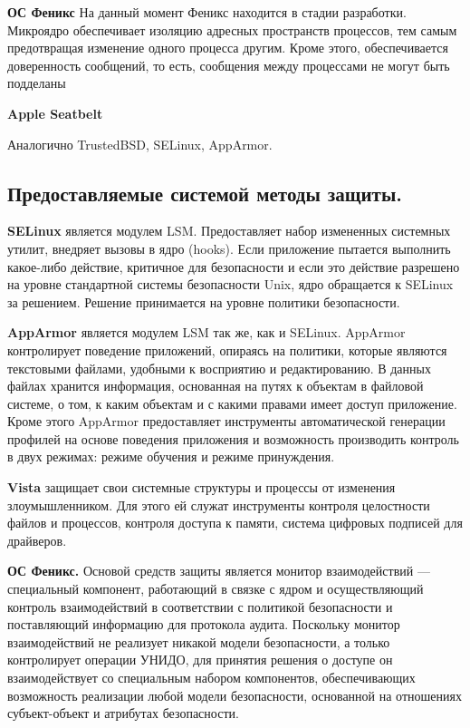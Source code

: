 \bigskip
{\bfseries ОС Феникс }
На данный момент Феникс находится в стадии разработки. 
Микроядро обеспечивает изоляцию адресных пространств 
процессов, тем самым предотвращая изменение одного 
процесса другим. Кроме этого, обеспечивается доверенность 
сообщений, то есть, сообщения между процессами не могут 
быть подделаны 

\bigskip
{\bfseries Apple Seatbelt}

Аналогично TrustedBSD, SELinux, AppArmor.

\bigskip
\subsection{Предоставляемые системой методы защиты.}

\bigskip
{\bfseries SELinux} является модулем LSM. 
Предоставляет набор измененных системных утилит, 
внедряет вызовы в ядро (hooks). Если приложение 
пытается выполнить какое-либо действие, критичное 
для безопасности и если это действие разрешено на 
уровне стандартной системы безопасности Unix, 
ядро обращается к SELinux за решением. Решение 
принимается на уровне политики безопасности. 

\bigskip
{\bfseries AppArmor} является модулем LSM так же, 
как и SELinux. AppArmor контролирует поведение 
приложений, опираясь на политики, которые являются 
текстовыми файлами, удобными к восприятию и редактированию. 
В данных файлах хранится информация, основанная на 
путях к объектам в файловой системе, о том, к каким 
объектам и с какими правами имеет доступ приложение. 
Кроме этого AppArmor предоставляет инструменты 
автоматической генерации профилей на основе поведения 
приложения и возможность производить контроль в двух 
режимах: режиме обучения и режиме принуждения. 

\bigskip
{\bfseries Vista} защищает свои системные структуры 
и процессы от изменения злоумышленником. Для этого 
ей служат инструменты контроля целостности файлов 
и процессов, контроля доступа к памяти, система 
цифровых подписей для драйверов. 

\bigskip
{\bfseries ОС Феникс.} Основой средств защиты является 
монитор взаимодействий — специальный компонент, 
работающий в связке с ядром и осуществляющий контроль 
взаимодействий в соответствии с политикой безопасности 
и поставляющий информацию для протокола аудита. Поскольку 
монитор взаимодействий не реализует никакой модели 
безопасности, а только контролирует операции УНИДО, 
для принятия решения о доступе он взаимодействует со 
специальным набором компонентов, обеспечивающих возможность 
реализации любой модели безопасности, основанной на 
отношениях субъект-объект и атрибутах безопасности. 

